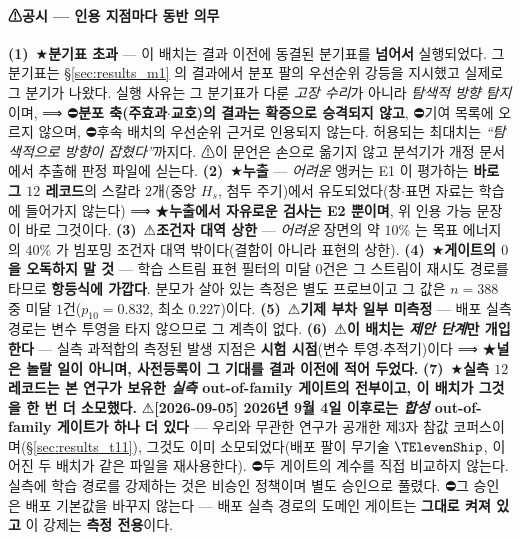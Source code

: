 \documentclass[11pt]{report}
\numberwithin{equation}{chapter}
\numberwithin{figure}{chapter}
\numberwithin{table}{chapter}
\begin{document}
\paragraph{⚠공시 --- 인용 지점마다 동반 의무}
\textbf{(1)}~★\textbf{분기표 초과} --- 이 배치는 결과 이전에 동결된 분기표를 \textbf{넘어서}
실행되었다. 그 분기표는 \S\ref{sec:results_m1} 의 결과에서 분포 팔의 우선순위 강등을
지시했고 실제로 그 분기가 나왔다. 실행 사유는 그 분기표가 다룬 \emph{고장 수리}가 아니라
\emph{탐색적 방향 탐지}이며, ⟹ ⛔\textbf{분포 축(주효과$\cdot$교호)의 결과는 확증으로
승격되지 않고}, ⛔기여 목록에 오르지 않으며, ⛔후속 배치의 우선순위 근거로 인용되지 않는다.
허용되는 최대치는 \emph{``탐색적으로 방향이 잡혔다''}까지다. ⚠이 문언은 손으로 옮기지 않고
분석기가 개정 문서에서 추출해 판정 파일에 싣는다.
\textbf{(2)}~★\textbf{누출} --- \emph{어려운} 앵커는 E1 이 평가하는 \textbf{바로 그 $12$
레코드}의 스칼라 $2$개(중앙 $H_s$, 첨두 주기)에서 유도되었다(창$\cdot$표면 자료는 학습에
들어가지 않는다) ⟹ ★\textbf{누출에서 자유로운 검사는 E2 뿐이며}, 위 인용 가능 문장이 바로
그것이다.
\textbf{(3)}~⚠\textbf{조건자 대역 상한} --- \emph{어려운} 장면의 약 $10\%$ 는 목표 에너지의
$40\%$ 가 빔포밍 조건자 대역 밖이다(결함이 아니라 표현의 상한).
\textbf{(4)}~★\textbf{게이트의 $0$ 을 오독하지 말 것} --- 학습 스트림 표현 필터의 미달
$0$건은 그 스트림이 재시도 경로를 타므로 \textbf{항등식에 가깝다}. 분모가 살아 있는 측정은
별도 프로브이고 그 값은 $n = 388$ 중 미달 $1$건($p_{10} = 0.832$, 최소 $0.227$)이다.
\textbf{(5)}~⚠\textbf{기제 부차 일부 미측정} --- 배포 실측 경로는 변수 투영을 타지 않으므로
그 계측이 없다.
\textbf{(6)}~⚠\textbf{이 배치는 \emph{제안 단계}만 개입한다} --- 실측 과적합의 측정된 발생
지점은 \textbf{시험 시점}(변수 투영$\cdot$추적기)이다 ⟹ ★\textbf{널은 놀랄 일이 아니며,
사전등록이 그 기대를 결과 이전에 적어 두었다.}
\textbf{(7)}~★\textbf{실측 $12$ 레코드는 본 연구가 보유한 \emph{실측} out-of-family
게이트의 전부이고, 이 배치가 그것을 한 번 더 소모했다.}
⚠\textbf{[2026-09-05] 2026년 9월 4일 이후로는 \emph{합성} out-of-family 게이트가 하나
더 있다} --- 우리와 무관한 연구가 공개한 제3자 참값 코퍼스이며(\S\ref{sec:results_t11}),
그것도 이미 소모되었다(배포 팔이 무기술 $\TElevenShip$, 이어진 두 배치가 같은 파일을
재사용한다). ⛔두 게이트의 계수를 직접 비교하지 않는다. 실측에 학습 경로를 강제하는 것은 비승인 정책이며 별도 승인으로
풀렸다. ⛔그 승인은 배포 기본값을 바꾸지 않는다 --- 배포 실측 경로의 도메인 게이트는
\textbf{그대로 켜져 있고} 이 강제는 \textbf{측정 전용}이다.
\end{document}
